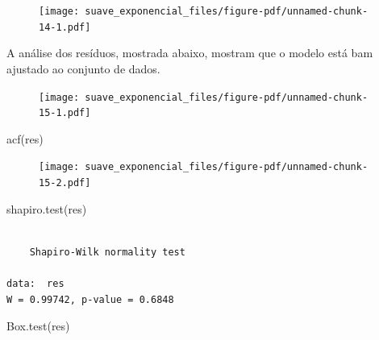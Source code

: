 \documentclass[
  letterpaper,
  DIV=11,
  numbers=noendperiod]{scrartcl}
\newenvironment{Shaded}{\begin{snugshade}}{\end{snugshade}}
\newcommand{\FunctionTok}[1]{\textcolor[rgb]{0.28,0.35,0.67}{#1}}
\newcommand{\NormalTok}[1]{\textcolor[rgb]{0.00,0.23,0.31}{#1}}
\newcommand{\OtherTok}[1]{\textcolor[rgb]{0.00,0.23,0.31}{#1}}
\newcommand{\SpecialCharTok}[1]{\textcolor[rgb]{0.37,0.37,0.37}{#1}}
\theoremstyle{plain}
\theoremstyle{plain}
\theoremstyle{definition}
\theoremstyle{definition}
\theoremstyle{remark}
\begin{document}
\begin{figure}[H]

{\centering \texttt{[image: suave\_exponencial\_files/figure-pdf/unnamed-chunk-14-1.pdf]}

}

\end{figure}

A análise dos resíduos, mostrada abaixo, mostram que o modelo está bam
ajustado ao conjunto de dados.

\begin{Shaded}
\end{Shaded}

\begin{figure}[H]

{\centering \texttt{[image: suave\_exponencial\_files/figure-pdf/unnamed-chunk-15-1.pdf]}

}

\end{figure}

\begin{Shaded}
\begin{Highlighting}[]
\FunctionTok{acf}\NormalTok{(res)}
\end{Highlighting}
\end{Shaded}

\begin{figure}[H]

{\centering \texttt{[image: suave\_exponencial\_files/figure-pdf/unnamed-chunk-15-2.pdf]}

}

\end{figure}

\begin{Shaded}
\begin{Highlighting}[]
\FunctionTok{shapiro.test}\NormalTok{(res)}
\end{Highlighting}
\end{Shaded}

\begin{verbatim}

    Shapiro-Wilk normality test

data:  res
W = 0.99742, p-value = 0.6848
\end{verbatim}

\begin{Shaded}
\begin{Highlighting}[]
\FunctionTok{Box.test}\NormalTok{(res)}
\end{Highlighting}
\end{Shaded}
\end{document}
